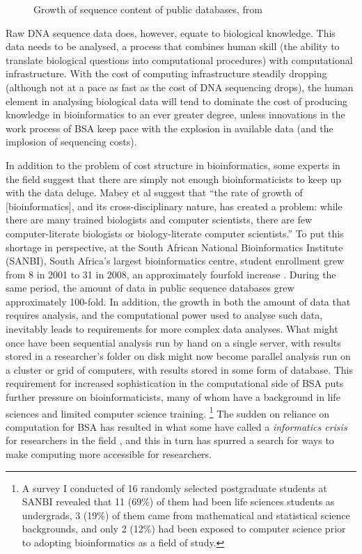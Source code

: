 \documentclass[a4paper,10pt]{scrreprt}
\begin{document}
\begin{figure}
  \vspace{-10pt}
  \caption{Growth of sequence content of public databases, from \cite{cochrane_international_2010}}
  \vspace{-10pt}
\end{figure}Raw DNA sequence data does, however, equate to biological knowledge. This data needs to be analysed, a process that combines human skill (the ability to translate biological questions into computational procedures) with computational infrastructure. With the cost of computing infrastructure steadily dropping (although not at a pace as fast as the cost of DNA sequencing drops), the human element in analysing biological data will tend to dominate the cost of producing knowledge in bioinformatics to an ever greater degree, unless innovations in the work process of \gls{BSA} keep pace with the explosion in available data (and the implosion of sequencing costs).

In addition to the problem of cost structure in bioinformatics, some experts in the field suggest that there are simply not enough bioinformaticists to keep up with the data deluge. Mabey et al \cite{mabey_report_2005} suggest that ``the rate of growth of [bioinformatics], and its cross-disciplinary nature, has created a problem: while there are many trained biologists and computer scientists, there are few computer-literate biologists or biology-literate computer scientists.'' To put this shortage in perspective, at the South African National Bioinformatics Institute (SANBI), South Africa's largest bioinformatics centre, student enrollment grew from 8 in 2001 to 31 in 2008, an approximately fourfold increase \cite{south_african_national_bioinformatics_institute_south_2010}. During the same period, the amount of data in public sequence databases grew approximately 100-fold.  In addition, the growth in both the amount of data that requires analysis, and the computational power used to analyse such data, 
inevitably leads to requirements for more complex data analyses. What might once have been sequential analysis run by hand on a single server, with results stored in a researcher's folder on disk might now become parallel analysis run on a cluster or grid of computers, with results stored in some form of database. This requirement for increased sophistication in the computational side of \gls{BSA} puts further pressure on bioinformaticists, many of whom have a background in life sciences and limited computer science training. \footnote{A survey I conducted of 16 randomly selected postgraduate students at SANBI revealed that 11 (69\%) of them had been life sciences students as undergrads, 3 (19\%) of them came from mathematical and statistical science backgrounds, and only 2 (12\%) had been exposed to computer science prior to adopting bioinformatics as a field of study.} The sudden on reliance on computation for \gls{BSA} has resulted in what some have called a \emph{informatics crisis} for researchers in 
the field \cite{goecks_galaxy:_2010}, and this in turn has spurred a search for ways to make computing more accessible for researchers.
\end{document}
